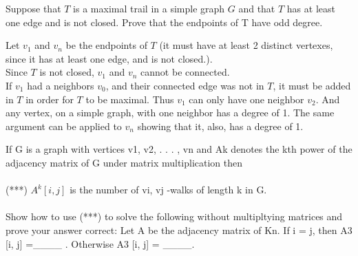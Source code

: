 \documentclass[12pt]{article}
\newenvironment{question}[2][Question]{\begin{trivlist}
\item[\hskip \labelsep {\bfseries #1}\hskip \labelsep {\bfseries #2.}]}{\end{trivlist}}
\begin{document}
\begin{question}{4}
Suppose that $T$ is a maximal trail in a simple graph $G$ and that $T$ has at least one edge and is not closed. Prove that the endpoints of T have odd degree.
\end{question}

Let $v_1$ and $v_n$ be the endpoints of $T$ (it must have at least 2 distinct vertexes, since it has at least one edge, and is not closed.). \\

Since $T$ is not closed, $v_1$ and $v_n$ cannot be connected. \\

If $v_1$ had a neighbors $v_0$, and their connected edge was not in $T$, it must be added in $T$ in order for $T$ to be maximal. Thus $v_1$ can only have one neighbor $v_2$. And any vertex, on a simple graph, with one neighbor has a degree of 1. The same argument can be applied to $v_n$ showing that it, also, has a degree of 1.

\begin{question}{5}
If G is a graph with vertices v1, v2, . . . , vn and Ak denotes the kth power of the adjacency matrix
of G under matrix multiplication then \\ \\
(***) $A^{k}[i, j]$ is the number of vi, vj -walks of length k in G. \\ \\
Show how to use (***) to solve the following without multipltying matrices and prove your answer
correct: Let A be the adjacency matrix of Kn. If i = j, then A3
[i, j] =\_\_\_\_ . Otherwise
A3
[i, j] = \_\_\_\_.
\end{question}
\end{document}

